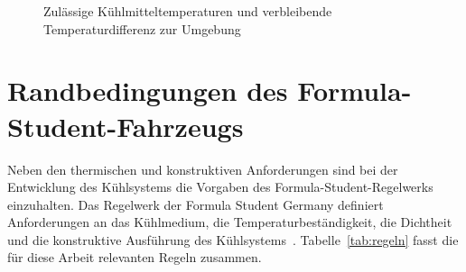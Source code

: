 \begin{figure}[htb]
  \centering
  \caption{Zulässige Kühlmitteltemperaturen und verbleibende Temperaturdifferenz zur Umgebung}
  \label{fig:temperaturgrenzen}
\end{figure}


\section{Randbedingungen des Formula-Student-Fahrzeugs}
\label{sec:randbedingungen}

Neben den thermischen und konstruktiven Anforderungen sind bei der Entwicklung
des Kühlsystems die Vorgaben des Formula-Student-Regelwerks einzuhalten. Das
Regelwerk der Formula Student Germany definiert Anforderungen an das
Kühlmedium, die Temperaturbeständigkeit, die Dichtheit und die konstruktive
Ausführung des Kühlsystems~\cite{fsg_rules}. Tabelle~\ref{tab:regeln} fasst die
für diese Arbeit relevanten Regeln zusammen.

